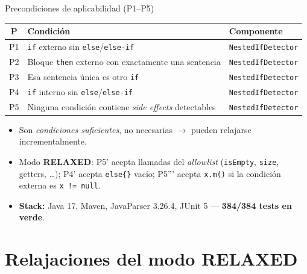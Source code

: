 \documentclass[aspectratio=169, 10pt]{beamer}
\newcommand{\ok}[1]{\textcolor{okgreen}{\textbf{#1}}}
\begin{document}
\begin{frame}{Precondiciones de aplicabilidad (P1--P5)}
  \begin{table}
    \centering
    \footnotesize
    \begin{tabular}{cll}
      \toprule
      \textbf{P} & \textbf{Condición} & \textbf{Componente} \\
      \midrule
      P1 & \texttt{if} externo sin \texttt{else}/\texttt{else-if} & \texttt{NestedIfDetector} \\
      P2 & Bloque \texttt{then} externo con exactamente una sentencia & \texttt{NestedIfDetector} \\
      P3 & Esa sentencia única es otro \texttt{if} & \texttt{NestedIfDetector} \\
      P4 & \texttt{if} interno sin \texttt{else}/\texttt{else-if} & \texttt{NestedIfDetector} \\
      P5 & Ninguna condición contiene \emph{side effects} detectables & \texttt{NestedIfDetector} \\
      \bottomrule
    \end{tabular}
  \end{table}

  \vspace{0.5em}
  \begin{itemize}
    \item Son \emph{condiciones suficientes}, no necesarias
          $\rightarrow$ pueden relajarse incrementalmente.
    \item Modo \textbf{RELAXED}: P5' acepta llamadas del \emph{allowlist}
          (\texttt{isEmpty}, \texttt{size}, getters, \ldots);
          P4' acepta \texttt{else\{\}} vacío; P5''' acepta
          \texttt{x.m()} si la condición externa es \texttt{x\,!=\,null}.
    \item \textbf{Stack:} Java 17, Maven, JavaParser 3.26.4, JUnit 5 ---
          \ok{384/384 tests en verde}.
  \end{itemize}
\end{frame}

\section{Relajaciones del modo RELAXED}
\end{document}

